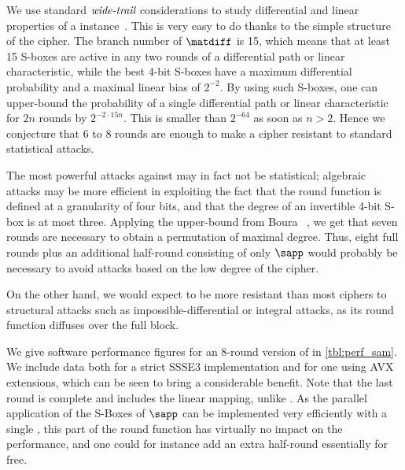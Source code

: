We use standard $\emph{wide-trail}$ considerations to study differential and linear properties of a \sam instance~\cite{aes}.
This is very easy to do thanks to the simple structure of the cipher.
The branch number of $\matdiff$ is 15, which means that at least 15 S-boxes are active in any two rounds of
a differential path or linear characteristic, while the best 4-bit S-boxes have a maximum differential probability
and a maximal linear bias of $2^{-2}$. By using
such S-boxes, one can upper-bound the probability of a single differential path or linear characteristic
for $2 n$ rounds by $2^{-2\cdot 15 n}$. This is smaller than $2^{-64}$
as soon as $n > 2$. Hence we conjecture that 6 to 8 rounds are enough to make a cipher resistant
to standard statistical attacks.

The most powerful attacks against \sam may in fact not be statistical; algebraic attacks may be more
efficient in exploiting the fact that the round function is defined at a granularity of four bits,
and that the degree of an invertible 4-bit S-box is at most three. Applying the upper-bound
from Boura \etal~\cite[Thm. 2]{permdegree}, we get that seven rounds are necessary to
obtain a permutation of maximal degree. Thus, eight full rounds plus an additional half-round
consisting of only $\sapp$ would probably be necessary to avoid attacks based on the low degree
of the cipher.

On the other hand, we would expect \sam to be more resistant than most ciphers to structural attacks such as
impossible-differential or integral attacks, as its round function diffuses over the full block.

We give software performance figures for an 8-round version of \sam in \autoref{tbl:perf_sam}.
We include data both for a strict SSSE3 implementation and for one using AVX extensions, which
can be seen to bring a considerable benefit. Note that the last round is complete and includes the linear mapping, unlike \eg{}
\AES{}.
As the parallel application of the S-Boxes of $\sapp$ can be implemented very efficiently with
a single \pshufb{}, this part of the round function has virtually no impact on the performance, and one
could for instance add an extra half-round essentially for free.

